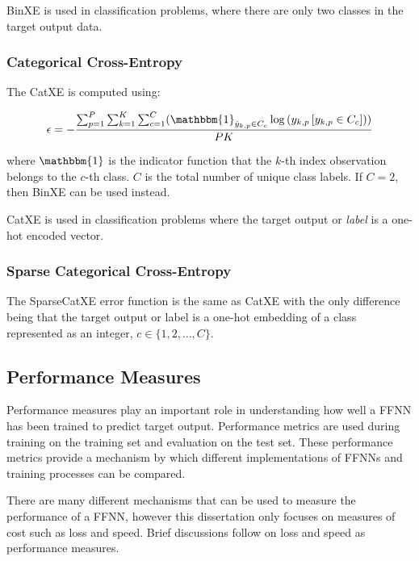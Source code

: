 \noindent \ac{BinXE} is used in classification problems, where there are only
two classes in the target output data.


\subsubsection{Categorical Cross-Entropy}
\label{sec:anns:training:error_functions:cat_xe}

The \ac{CatXE} is computed using:

\begin{equation}
    \epsilon = -\frac{\sum_{p=1}^P \sum_{k=1}^K \sum_{c=1}^C (\mathbbm{1}_{\hat{y}_{k,p} \in C_c} \log{(y_{k,p} \left[ y_{k,p} \in C_c \right])})}{PK}
  \label{eq:cat_xe}
\end{equation}

\noindent where $\mathbbm{1}$ is the indicator function that the $k$-th index observation
belongs to the $c$-th class. $C$ is the total number of unique class labels. If
$C = 2$, then \ac{BinXE} can be used instead.

\ac{CatXE} is used in classification problems where the target
output or \textit{label} is a one-hot encoded vector.


\subsubsection{Sparse Categorical Cross-Entropy}
\label{sec:anns:training:error_functions:sparse_cat_xe}

The \ac{SparseCatXE} error function is the same as \ac{CatXE} with the only
difference being that the target output or label is a one-hot
embedding of a class represented as an integer, $c \in \{1,2, \dots, C\}$.


\subsection{Performance Measures}
\label{sec:anns:training:performance_measures}

Performance measures play an important role in understanding how well a
\ac{FFNN} has been trained to predict target output. Performance metrics are
used during training on the training set and evaluation on the test set. These
performance metrics provide a mechanism by which different implementations of
\acp{FFNN} and training processes can be compared.

There are many different mechanisms that can be used to measure the performance
of a \ac{FFNN}, however this dissertation only focuses on measures of cost such as
loss and speed. Brief discussions follow on loss and speed as performance
measures.

